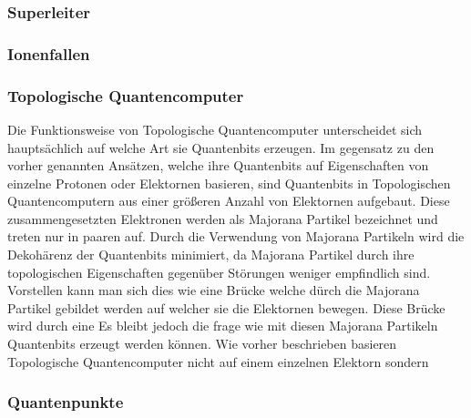 \subsubsection{Superleiter}
\label{subsub:superleiter}


\subsubsection{Ionenfallen}
\label{subsub:ionenfallen}

\subsubsection{Topologische Quantencomputer}
\label{subsub:topologische_quantencomputer}
Die Funktionsweise von Topologische Quantencomputer unterscheidet sich hauptsächlich auf welche Art sie Quantenbits erzeugen.
Im gegensatz zu den vorher genannten Ansätzen, welche ihre Quantenbits auf Eigenschaften von einzelne Protonen oder Elektornen basieren, sind Quantenbits in Topologischen Quantencomputern aus einer größeren Anzahl von Elektornen aufgebaut.
Diese zusammengesetzten Elektronen werden als Majorana Partikel bezeichnet und treten nur in paaren auf. Durch die Verwendung von Majorana Partikeln wird die Dekohärenz der Quantenbits minimiert, da Majorana Partikel durch ihre topologischen Eigenschaften gegenüber Störungen weniger empfindlich sind.
Vorstellen kann man sich dies wie eine Brücke welche dürch die Majorana Partikel gebildet werden auf welcher sie die Elektornen bewegen. Diese Brücke wird durch eine 
Es bleibt jedoch die frage wie mit diesen Majorana Partikeln Quantenbits erzeugt werden können. Wie vorher beschrieben basieren Topologische Quantencomputer nicht auf einem einzelnen Elektorn sondern 

\subsubsection{Quantenpunkte}
\label{subsub:quantenpunkte}
